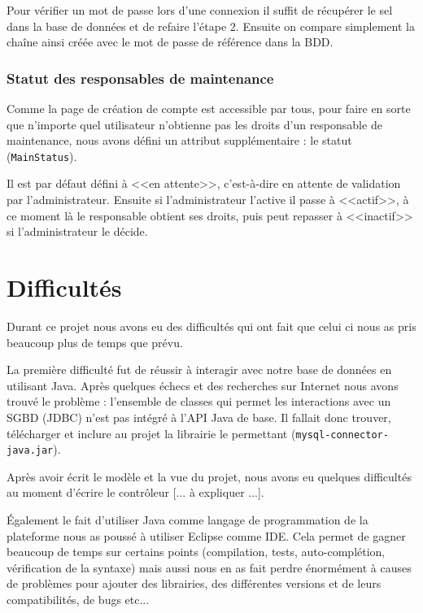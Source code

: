 Pour vérifier un mot de passe lors d'une connexion il suffit de récupérer le sel dans la base
de données et de refaire l'étape 2. Ensuite on compare simplement la chaîne ainsi créée avec le
mot de passe de référence dans la BDD.

\subsection{Statut des responsables de maintenance}

Comme la page de création de compte est accessible par tous, pour faire en sorte que n'importe
quel utilisateur n'obtienne pas les droits d'un responsable de maintenance, nous avons défini
un attribut supplémentaire : le statut (\verb:MainStatus:).

Il est par défaut défini à <<en attente>>, c'est-à-dire en attente de validation par
l'administrateur. Ensuite si l'administrateur l'active il passe à <<actif>>, à ce moment là le
responsable obtient ses droits, puis peut repasser à <<inactif>> si l'administrateur le décide.

\chapter{Difficultés}

Durant ce projet nous avons eu des difficultés qui ont fait que celui ci nous as pris beaucoup
plus de temps que prévu.\newline

La première difficulté fut de réussir à interagir avec notre base de données en utilisant Java.
Après quelques échecs et des recherches sur Internet nous avons trouvé le problème : l'ensemble
de classes qui permet les interactions avec un SGBD (JDBC) n'est pas intégré à l'API Java de
base. Il fallait donc trouver, télécharger et inclure au projet la librairie le permettant
(\verb:mysql-connector-java.jar:).\newline

Après avoir écrit le modèle et la vue du projet, nous avons eu quelques difficultés au moment
d'écrire le contrôleur [... à expliquer ...].\newline

Également le fait d'utiliser Java comme langage de programmation de la plateforme nous as
poussé à utiliser Eclipse comme IDE. Cela permet de gagner beaucoup de temps sur certains points
(compilation, tests, auto-complétion, vérification de la syntaxe) mais aussi nous en as fait
perdre énormément à causes de problèmes pour ajouter des librairies, des différentes versions
et de leurs compatibilités, de bugs etc...

